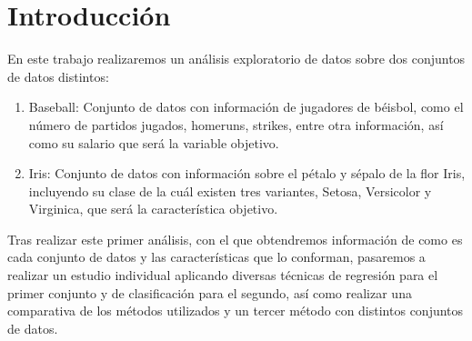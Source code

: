 \section{Introducción}

En este trabajo realizaremos un análisis exploratorio de datos sobre dos conjuntos de datos distintos:

\begin{enumerate}
	\item Baseball: Conjunto de datos con información de jugadores de béisbol, como el número de partidos jugados, homeruns, strikes, entre otra información, así como su salario que será la variable objetivo.
	\item Iris: Conjunto de datos con información sobre el pétalo y sépalo de la flor Iris, incluyendo su clase de la cuál existen tres variantes, Setosa, Versicolor y Virginica, que será la característica objetivo.
\end{enumerate}

Tras realizar este primer análisis, con el que obtendremos información de como es cada conjunto de datos y las características que lo conforman, pasaremos a realizar un estudio individual aplicando diversas técnicas de regresión para el primer conjunto y de clasificación para el segundo, así como realizar una comparativa de los métodos utilizados y un tercer método con distintos conjuntos de datos.

\newpage
